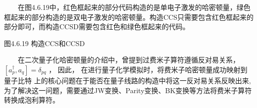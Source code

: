 \documentclass[a4paper,11pt,english]{sphinxmanual}
\begin{document}
\begin{sphinxVerbatim}[commandchars=\\\{\}]
                        
                        \PYG{p}{[}\PYG{p}{]}
                    
                      
     
\end{sphinxVerbatim}

\sphinxAtStartPar
  在图4.6.19中，红色框起来的部分代码构造的是单电子激发的哈密顿量，绿色框起来的部分构造的是双电子激发的哈密顿量。构造CCS只需要包含红色框起来的部分即可，而构造CCSD需要包含红色和绿色框起来的代码。


\begin{center}图4.6.19 构造CCS和CCSD
\end{center}
\sphinxAtStartPar
  在二次量子化哈密顿量的介绍中，曾提到过费米子算符遵循反对易关系，  \(\left[a_{p}^{\dagger}, a_{q}\right]=\delta_{p q}\) ， 因此， 在进行量子化学模拟时，将费米子哈密顿量成功映射到量子比特 上的核心问题在于能否在量子线路的构造中将这一反对易关系反映出来,为了解决这一问题，需要通过J\sphinxhyphen{}W变换、Parity变换、B\sphinxhyphen{}K变换等方法将费米子算符转换成泡利算符。
\end{document}
